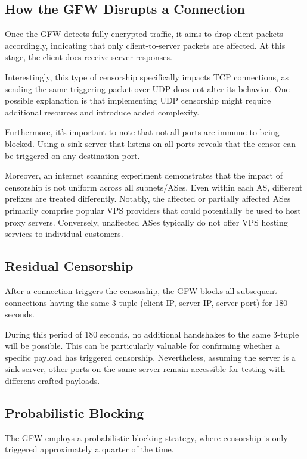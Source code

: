 \subsection{How the GFW Disrupts a Connection}
Once the GFW detects fully encrypted traffic, it aims to drop client packets accordingly, indicating that only client-to-server packets are affected. At this stage, the client does receive server responses.

Interestingly, this type of censorship specifically impacts TCP connections, as sending the same triggering packet over UDP does not alter its behavior. One possible explanation is that implementing UDP censorship might require additional resources and introduce added complexity.

Furthermore, it's important to note that not all ports are immune to being blocked. Using a sink server that listens on all ports reveals that the censor can be triggered on any destination port.

Moreover, an internet scanning experiment demonstrates that the impact of censorship is not uniform across all subnets/ASes. Even within each AS, different prefixes are treated differently. Notably, the affected or partially affected ASes primarily comprise popular VPS providers that could potentially be used to host proxy servers. Conversely, unaffected ASes typically do not offer VPS hosting services to individual customers.\cite{wu2023great}

\subsection{Residual Censorship}
After a connection triggers the censorship, the GFW blocks all subsequent connections having the same 3-tuple (client IP, server IP, server port) for 180 seconds.\cite{wu2023great}

During this period of 180 seconds, no additional handshakes to the same 3-tuple will be possible. This can be particularly valuable for confirming whether a specific payload has triggered censorship. Nevertheless, assuming the server is a sink server, other ports on the same server remain accessible for testing with different crafted payloads. 

\subsection{Probabilistic Blocking}
The GFW employs a probabilistic blocking strategy, where censorship is only triggered approximately a quarter of the time.

